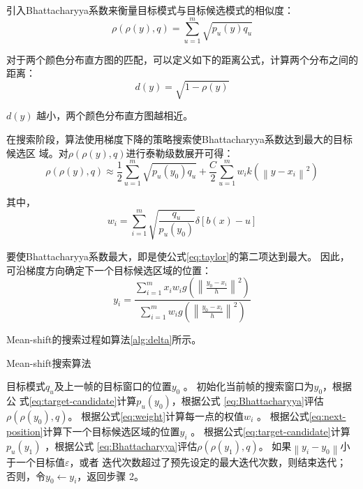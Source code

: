 引入Bhattacharyya系数来衡量目标模式与目标候选模式的相似度：
\begin{equation}
  \label{eq:Bhattacharyya}
  \rho(\rho(y),q)=\sum_{u=1}^{m}\sqrt{p_{u}(y)q_{u}}
\end{equation}

对于两个颜色分布直方图的匹配，可以定义如下的距离公式，计算两个分布之间的距离：
\begin{equation}
  \label{eq:distance}
  d(y)=\sqrt{1-\rho(y)}
\end{equation}

$d(y)$ 越小，两个颜色分布直方图越相近。

在搜索阶段，算法使用梯度下降的策略搜索使Bhattacharyya系数达到最大的目标候选区
域。对$\rho(\rho(y),q)$进行泰勒级数展开可得：
\begin{equation}
  \label{eq:taylor}
  \rho(\rho(y),q)\approx \frac{1}{2}\sum_{u=1}^{m}\sqrt{p_u(y_0)q_u}+\frac{C}{2}\sum_{u=1}^{m}w_{i}k(\left\|y-x_i\right\|^2)
\end{equation}

其中，
\begin{equation}
    \label{eq:weight}
    w_{i}=\sum_{i=1}^{m}\sqrt{\frac{q_u}{p_{u}(y_0)}}\delta[b(x)-u]
\end{equation}

要使Bhattacharyya系数最大，即是使公式\ref{eq:taylor}的第二项达到最大。
因此，可沿梯度方向确定下一个目标候选区域的位置：
\begin{equation}
    \label{eq:next-position}
    y_{i}=\frac{\sum_{i=1}^{m}x_{i}w_{i}g\left(\left\|\frac{y_0-x_i}{h}\right\|^{2}\right)}{\sum_{i=1}^{m}w_{i}g\left(\left\|\frac{y_0-x_i}{h}\right\|^{2}\right)}
  \end{equation}

Mean-shift的搜索过程如算法\ref{alg:delta}所示。

\begin{algorithm}[htbp]
  \caption{Mean-shift搜索算法}
  \label{alg:delta}
  \begin{algorithmic}[1]
    \REQUIRE 目标模式$q_u$及上一帧的目标窗口的位置$y_0$ 。
    \STATE 初始化当前帧的搜索窗口为$y_0$，根据公
    式\ref{eq:target-candidate}计算$p_u(y_0)$，根据公式
   \ref{eq:Bhattacharyya}评估$\rho(\rho(y_0),q)$。
    \STATE 根据公式\ref{eq:weight}计算每一点的权值$w_{i}$ 。
    \STATE 根据公式\ref{eq:next-position}计算下一个目标候选区域的位置$y_{i}$
   。
    \STATE 根据公式\ref{eq:target-candidate}计算$p_u(y_1)$ ，根据公式
   \ref{eq:Bhattacharyya}评估$\rho(\rho(y_1),q)$。
    \STATE 如果$\left\|y_{i}-y_{0}\right\|$小于一个目标值$\varepsilon$，或者
    迭代次数超过了预先设定的最大迭代次数，则结束迭代；\\
    否则，令$y_{0}\leftarrow y_{i}$，返回步骤 2。
  \end{algorithmic}
\end{algorithm}
\par

